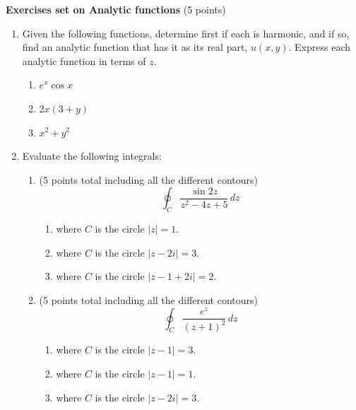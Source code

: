 \documentclass[fleqn]{article}
\begin{document}
  \textbf{Exercises set on Analytic functions} (5 points)
  \begin{enumerate}

    \item  Given the following functions, determine first if each is harmonic, and if so, find an analytic function that has it as its real part, $u(x,y)$. Express each analytic function in terms of $z$.
    
    \begin{enumerate}
    
      \item $e^{x}\cos x$
      
      \item $2x\left( 3+y\right)$
      
      \item $x^{2}+y^{2}$
    \end{enumerate}
    
    
    \item Evaluate the following integrals:
    
    \begin{enumerate}
    
    \item  (5 points total including all the different contours)
    \[
    \oint_{C}\frac{\sin 2z}{z^{2}-4z+5}\,dz
    \]
    
    \begin{enumerate}
      \item where $C$ is the circle $\left| z\right| =1.$
      
      \item where $C$ is the circle $\left| z-2i\right| =3.$
      
      \item where $C$ is the circle $\left| z-1+2i\right| =2.$
    \end{enumerate}
    
    \item   (5 points total including all the different contours)
    \[
    \oint_{C}\frac{e^{z}}{\left( z+1\right) ^{2}}\,dz
    \]
    
      \begin{enumerate}
        \item where $C$ is the circle $\left| z-1\right| =3.$
        
        \item where $C$ is the circle $\left| z-1\right| =1.$
        
        \item where $C$ is the circle $\left| z-2i\right| =3.$
      \end{enumerate}
    \end{enumerate}
    

\end{enumerate}
\end{document}
